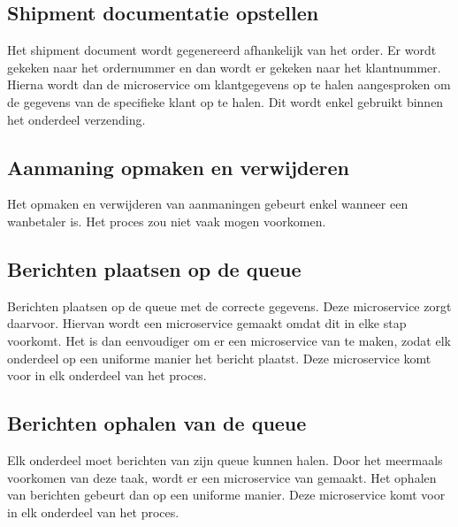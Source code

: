 \subsection{Shipment documentatie opstellen}
Het shipment document wordt gegenereerd afhankelijk van het order. Er wordt gekeken naar het ordernummer en dan wordt er gekeken naar het klantnummer. Hierna wordt dan de microservice om klantgegevens op te halen aangesproken om de gegevens van de specifieke klant op te halen. Dit wordt enkel gebruikt binnen het onderdeel verzending.

\subsection{Aanmaning opmaken en verwijderen}
Het opmaken en verwijderen van aanmaningen gebeurt enkel wanneer een wanbetaler is. Het proces zou niet vaak mogen voorkomen. 

\subsection{Berichten plaatsen op de queue}
Berichten plaatsen op de queue met de correcte gegevens. Deze microservice zorgt daarvoor. Hiervan wordt een microservice gemaakt omdat dit in elke stap voorkomt. Het is dan eenvoudiger om er een microservice van te maken, zodat elk onderdeel op een uniforme manier het bericht plaatst. 
Deze microservice komt voor in elk onderdeel van het proces.

\subsection{Berichten ophalen van de queue} 
Elk onderdeel moet berichten van zijn queue kunnen halen. Door het meermaals voorkomen van deze taak, wordt er een microservice van gemaakt. Het ophalen van berichten gebeurt dan op een uniforme manier. 
Deze microservice komt voor in elk onderdeel van het proces.

